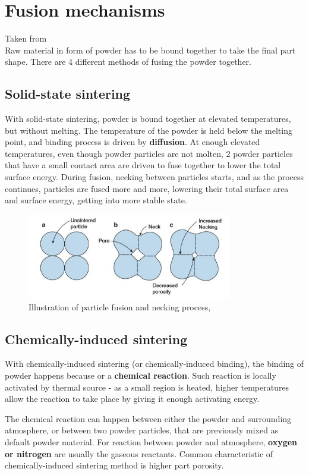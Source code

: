 \documentclass[a4paper, twoside, 11pt]{report}
\begin{document}
\section{Fusion mechanisms}
Taken from \cite{AMT}\\
Raw material in form of powder has to be bound together to take the final part shape. There are 4 different methods of  fusing the powder together.
\subsection{Solid-state sintering}
With solid-state sintering, powder is bound together at elevated temperatures, but without melting. The temperature of the powder is held below the melting point, and binding process is driven by \textbf{diffusion}. At enough elevated temperatures, even though powder particles are not molten, 2 powder particles that have a small contact area are driven to fuse together to lower the total surface energy.
During fusion, necking between particles starts, and as the process continues, particles are fused more and more, lowering their total surface area and surface energy, getting into more stable state.\\
\begin{figure}[t]
	\centering
 	\includegraphics[width=0.8\textwidth]{necking}
	\caption{Illustration of particle fusion and necking process, \cite[p. 113]{AMT} }
\end{figure}

\subsection{Chemically-induced sintering}
With chemically-induced sintering (or chemically-induced binding), the binding of powder happens because or a \textbf{chemical reaction}. Such reaction is locally activated by thermal source - as a small region is heated, higher temperatures allow the reaction to take place by giving it enough activating energy.

	The chemical reaction can happen between either the powder and surrounding atmosphere, or between two powder particles, that are previously mixed as default powder material. For reaction between powder and atmosphere, \textbf{oxygen or nitrogen} are usually the gaseous reactants. Common characteristic of chemically-induced sintering method is higher part porosity.
	
\end{document}
